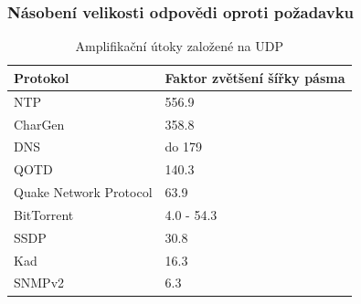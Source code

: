\documentclass[%
  12pt,       				%
	t,                  %
	aspectratio=1610,   %
	unicode,						%
czech,              %
]{beamer}				    	%
\begin{document}
\begin{frame}
	\frametitle{Násobení velikosti odpovědi oproti požadavku}
	\vspace{0.1cm}
		\begin{table}[ht]
			\centering
			\caption{Amplifikační útoky založené na UDP}
			\label{tab:udp_ampl}
			\begin{tabular}{|l|l|}
				\hline
				\textbf{Protokol}      & \textbf{Faktor zvětšení šířky pásma}    \\ \hline
				NTP                    & 556.9                                   \\ \hline
				CharGen                & 358.8                                   \\ \hline
				DNS                    & do 179                                  \\ \hline
				QOTD                   & 140.3                                   \\ \hline
				Quake Network Protocol & 63.9                                    \\ \hline
				BitTorrent             & 4.0 - 54.3                              \\ \hline
				SSDP                   & 30.8                                    \\ \hline
				Kad                    & 16.3                                    \\ \hline
				SNMPv2                 & 6.3                                     \\ \hline
			\end{tabular}
	\end{table}
\end{frame}

\end{document}
